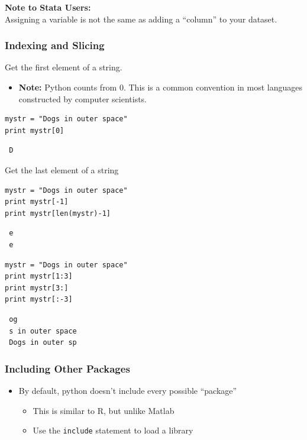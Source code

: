 \documentclass[11pt]{article}
\begin{document}
\textbf{Note to Stata Users:}\\
Assigning a variable is not the same as adding a ``column'' to your dataset.
\subsubsection{Indexing and Slicing}
\label{sec-2-3-2}

Get the first element of a string.

\begin{itemize}
\item \textbf{Note:} Python counts from 0.  This is a common convention in most
  languages constructed by computer scientists.
\end{itemize}


\begin{verbatim}
mystr = "Dogs in outer space"
print mystr[0]
\end{verbatim}

\begin{verbatim}
 D
\end{verbatim}

Get the last element of a string

\begin{verbatim}
mystr = "Dogs in outer space"
print mystr[-1]
print mystr[len(mystr)-1]
\end{verbatim}

\begin{verbatim}
 e
 e
\end{verbatim}


\begin{verbatim}
mystr = "Dogs in outer space"
print mystr[1:3]
print mystr[3:]
print mystr[:-3]
\end{verbatim}

\begin{verbatim}
 og
 s in outer space
 Dogs in outer sp
\end{verbatim}
\subsubsection{Including Other Packages}
\label{sec-2-3-3}


\begin{itemize}
\item By default, python doesn't include every possible ``package''
\begin{itemize}
\item This is similar to R, but unlike Matlab
\item Use the \texttt{include} statement to load a library
\end{itemize}
\end{itemize}
\end{document}
